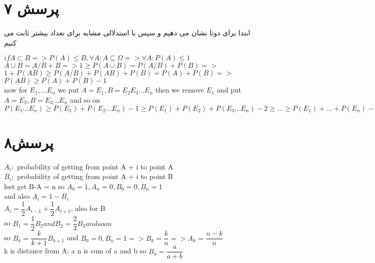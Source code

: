\documentclass[a4paper]{article}
\begin{document}
\section*{پرسش ۷}
ابتدا برای دوتا نشان می دهیم و سپس با استدلالی مشابه برای تعداد بیشتر ثابت می کنیم
\begin{latin}
$ if A \subset B => P(A) \leq B, \forall A: A \subseteq \Omega => \forall A: P(A) \leq 1 $\\
$ A \cup B = A/B + B  => 1 \geq P(A \cup B) = P(A/B) + P(B) =>$\\
$ 1 + P(AB) \geq P(A/B) + P(AB) + P(B) = P(A) + P(B) => $\\
$P(AB) \geq P(A) + P(B) - 1 $\\
now for $E_1,... E_n$ we put $A = E_1, B = E_2E_3...E_n$ then we remove $E_1$ and put $A=E_2, B=E_3...E_n$ and so on\\
$P(E_1...E_n) \geq P(E_1) + P(E_2...E_n) - 1 \geq P(E_1) + P(E_2) + P(E_3...E_n) - 2 \geq ... \geq P(E_1) + ... + P(E_n) - (n-1)$\\
\end{latin}
\pagebreak
\section*{پرسش۸}
\begin{latin}
$A_i :$ probability of getting from point A + i to point A\\
$B_i :$ probability of getting from point A + i to point B\\
lest get B-A = n
so $A_0 = 1, A_n = 0, B_0 = 0, B_n = 1$\\
and also $A_i = 1 - B_i$ \\
$ A_i = \dfrac{1}{2}A_{i-1} + \dfrac{1}{2}A_{i+1}$, also for B\\
so $B_1 = \dfrac{1}{2}B_2 and B_2 = \dfrac{2}{3}B_3 and so on$\\
so $B_k = \dfrac{k}{k+1}B_{k+1}$
and $B_0 = 0, B_n = 1 => B_k = \dfrac{k}{n} => A_k = \dfrac{n - k}{n}$\\
k is distance from A: a
n is sum of a and b so $B_a = \dfrac{a}{a+b}$

\end{latin}

\pagebreak
\end{document}
